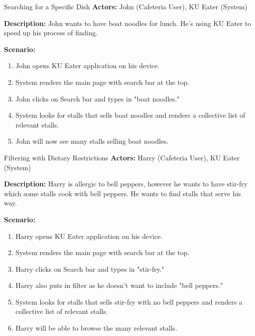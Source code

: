 \begin{usecase}{Searching for a Specific Dish}
    \textbf{Actors:} John (Cafeteria User), KU Eater (System)
    
    \textbf{Description:} John wants to have boat noodles for lunch. He's using KU Eater to speed up
    his process of finding.

    \textbf{Scenario:}

    \begin{enumerate}[leftmargin=80pt]
        \item John opens KU Eater application on his device.
        \item System renders the main page with search bar at the top.
        \item John clicks on Search bar and types in "boat noodles."
        \item System looks for stalls that sells boat noodles and renders a collective list of relevant stalls.
        \item John will now see many stalls selling boat noodles.
    \end{enumerate}
\end{usecase}

\begin{usecase}{Filtering with Dietary Restrictions}
    \textbf{Actors:} Harry (Cafeteria User), KU Eater (System)

    \textbf{Description:} Harry is allergic to bell peppers, however he wants to have stir-fry which some stalls cook with bell peppers.
    He wants to find stalls that serve his way.

    \textbf{Scenario:}

    \begin{enumerate}[leftmargin=80pt]
        \item Harry opens KU Eater application on his device.
        \item System renders the main page with search bar at the top.
        \item Harry clicks on Search bar and types in "stir-fry."
        \item Harry also puts in filter as he doesn't want to include "bell peppers."
        \item System looks for stalls that sells stir-fry with no bell peppers and renders a collective list of relevant stalls.
        \item Harry will be able to browse the many relevant stalls.
    \end{enumerate}
\end{usecase}

